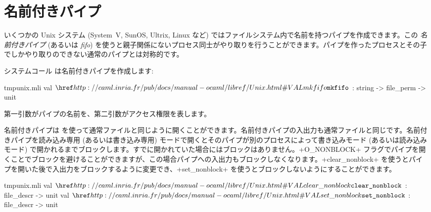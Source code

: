 \section{名前付きパイプ}

いくつかの Unix システム (System~V, SunOS, Ultrix, Linux など) ではファイルシステム内で名前を持つパイプを作成できます。この \emph{名前付きパイプ} (あるいは \emph{fifo}) を使うと親子関係にないプロセス同士がやり取りを行うことができます。パイプを作ったプロセスとその子でしかやり取りのできない通常のパイプとは対称的です。

システムコール  は名前付きパイプを作成します:
%
\begin{listingcodefile}{tmpunix.mli}
val $\libvalue{Unix}{mkfifo}$ : string -> file_perm -> unit
\end{listingcodefile}
%
第一引数がパイプの名前を、第二引数がアクセス権限を表します。

名前付きパイプは  を使って通常ファイルと同じように開くことができます。名前付きパイプの入出力も通常ファイルと同じです。名前付きパイプを読み込み専用 (あるいは書き込み専用) モードで開くとそのパイプが別のプロセスによって書き込みモード (あるいは読み込みモード) で開かれるまでブロックします。すでに開かれていた場合にはブロックはありません。\ml+O_NONBLOCK+ フラグでパイプを開くことでブロックを避けることができますが、この場合パイプへの入出力もブロックしなくなります。\ml+clear_nonblock+ を使うとパイプを開いた後で入出力をブロックするように変更でき、\ml+set_nonblock+ を使うとブロックしないようにすることができます。
%
\begin{listingcodefile}{tmpunix.mli}
val $\indexlibvalue{Unix}{clear\_nonblock}$ : file_descr -> unit
val $\indexlibvalue{Unix}{set\_nonblock}$ : file_descr -> unit
\end{listingcodefile}

